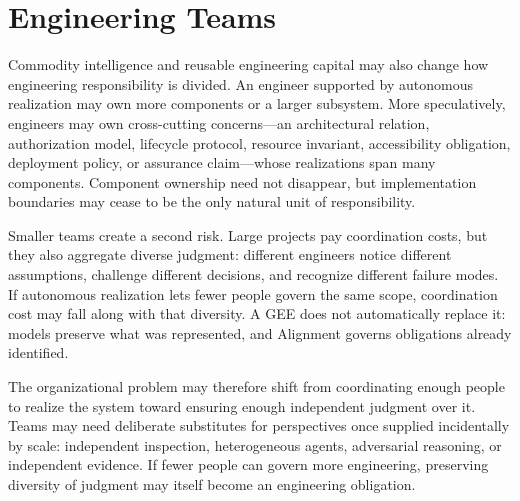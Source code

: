 \section{Engineering Teams}\label{heading:engineering-teams}

Commodity intelligence and reusable engineering capital may also change how engineering responsibility is divided. An engineer supported by autonomous realization may own more components or a larger subsystem. More speculatively, engineers may own cross-cutting concerns---an architectural relation, authorization model, lifecycle protocol, resource invariant, accessibility obligation, deployment policy, or assurance claim---whose realizations span many components. Component ownership need not disappear, but implementation boundaries may cease to be the only natural unit of responsibility.

Smaller teams create a second risk. Large projects pay coordination costs, but they also aggregate diverse judgment: different engineers notice different assumptions, challenge different decisions, and recognize different failure modes. If autonomous realization lets fewer people govern the same scope, coordination cost may fall along with that diversity. A GEE does not automatically replace it: models preserve what was represented, and Alignment governs obligations already identified.

The organizational problem may therefore shift from coordinating enough people to realize the system toward ensuring enough independent judgment over it. Teams may need deliberate substitutes for perspectives once supplied incidentally by scale: independent inspection, heterogeneous agents, adversarial reasoning, or independent evidence. If fewer people can govern more engineering, preserving diversity of judgment may itself become an engineering obligation.
